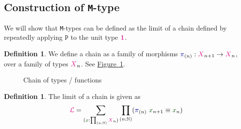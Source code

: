 \documentclass[twoside,11pt,openright]{report}
\theoremstyle{plain} %
\theoremstyle{definition}
\newtheorem{defn}[thm]{Definition}%
\theoremstyle{remark}
\newcommand*{\figref}[1]{\hyperref[fig:#1]{Figure~\ref*{fig:#1}}}
\newcommand*{\term}[1]{\textcolor{green!30!black}{#1}} %
\newcommand*{\type}[1]{\textcolor{magenta!90!black}{#1}}
\newcommand*{\unit}{\type{\textbf{1}}}
\newcommand*{\function}[1]{\textcolor{blue!60!black}{\ensuremath{\mathtt{#1}}}}
\newcommand*{\functor}[1]{\ensuremath{\mathbf{\mathtt{#1}}}}
\begin{document}
\subsection{Construction of \texttt{M}-type}
We will show that \texttt{M}-types can be defined as the limit of a chain defined by repeatedly applying \(\functor{P}\) to the unit type \(\unit\).
\begin{defn}
  We define a chain as a family of morphisms \(\function{\pi}_{(n)} : \type{X}_{n+1} \rightarrow \type{X}_{n}\), over a family of types \(\type{X}_{n}\). See \figref{x-chain}.
  \begin{figure}[h]
    \centering
    \caption{Chain of types / functions}
    \label{fig:x-chain}
  \end{figure}
\end{defn}
\begin{defn}
  The limit of a chain is given as
  \begin{equation}
    \type{\mathcal{L}} = \sum_{(\term{x} : \prod_{(n : \mathbb{N})} \type{X}_n)} \prod_{(n : \mathbb{N})} (\function{\pi}_{(n)}~\term{x}_{n+1} \equiv \term{x}_n)
  \end{equation}
\end{defn}
\end{document}
